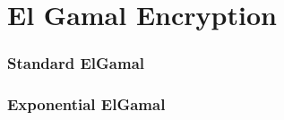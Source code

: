 \section{El Gamal Encryption}

\subsubsection{Standard ElGamal}

\subsubsection{Exponential ElGamal}

